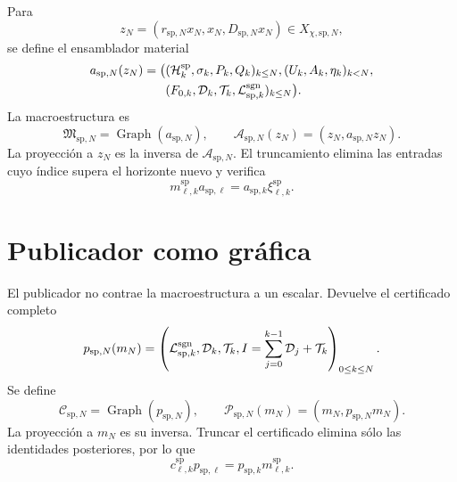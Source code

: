 Para
\[
 z_N=(r_{\mathrm{sp},N}x_N,x_N,D_{\mathrm{sp},N}x_N)
 \in X_{\chi,\mathrm{sp},N},
\]
se define el ensamblador material
\begin{equation}
\label{eq:continuo-sp-a-accion}
\begin{aligned}
 a_{\mathrm{sp},N}(z_N)=\bigl(&
 (\mathcal H_k^{\mathrm{sp}},\sigma_k,P_k,Q_k)_{k\leq N},
 (U_k,A_k,\eta_k)_{k<N},\\
 &(F_{0,k},\mathcal D_k,\mathcal T_k,
   \mathcal L^{\rm sgn}_{\mathrm{sp},k})_{k\leq N}\bigr).
\end{aligned}
\end{equation}
La macroestructura es
\begin{equation}
\label{eq:continuo-sp-m-graph}
 \mathfrak M_{\mathrm{sp},N}
 =\operatorname{Graph}(a_{\mathrm{sp},N}),
 \qquad
 \mathcal A_{\mathrm{sp},N}(z_N)
 =(z_N,a_{\mathrm{sp},N}z_N).
\end{equation}
La proyección a \(z_N\) es la inversa de
\(\mathcal A_{\mathrm{sp},N}\). El truncamiento elimina las entradas cuyo
índice supera el horizonte nuevo y verifica
\begin{equation}
\label{eq:continuo-sp-a-naturalidad}
 m^{\mathrm{sp}}_{\ell,k}a_{\mathrm{sp},\ell}
 =a_{\mathrm{sp},k}\xi^{\mathrm{sp}}_{\ell,k}.
\end{equation}

\section{Publicador como gráfica}

El publicador no contrae la macroestructura a un escalar. Devuelve el
certificado completo
\begin{equation}
\label{eq:continuo-sp-p-accion}
 p_{\mathrm{sp},N}(m_N)
 =\left(
 \mathcal L^{\rm sgn}_{\mathrm{sp},k},
 \mathcal D_k,
 \mathcal T_k,
 I=\sum_{j=0}^{k-1}\mathcal D_j+\mathcal T_k
 \right)_{0\leq k\leq N}.
\end{equation}
Se define
\begin{equation}
\label{eq:continuo-sp-c-graph}
 \mathcal C_{\mathrm{sp},N}
 =\operatorname{Graph}(p_{\mathrm{sp},N}),
 \qquad
 \mathcal P_{\mathrm{sp},N}(m_N)
 =(m_N,p_{\mathrm{sp},N}m_N).
\end{equation}
La proyección a \(m_N\) es su inversa. Truncar el certificado elimina sólo
las identidades posteriores, por lo que
\begin{equation}
\label{eq:continuo-sp-p-naturalidad}
 c^{\mathrm{sp}}_{\ell,k}p_{\mathrm{sp},\ell}
 =p_{\mathrm{sp},k}m^{\mathrm{sp}}_{\ell,k}.
\end{equation}

